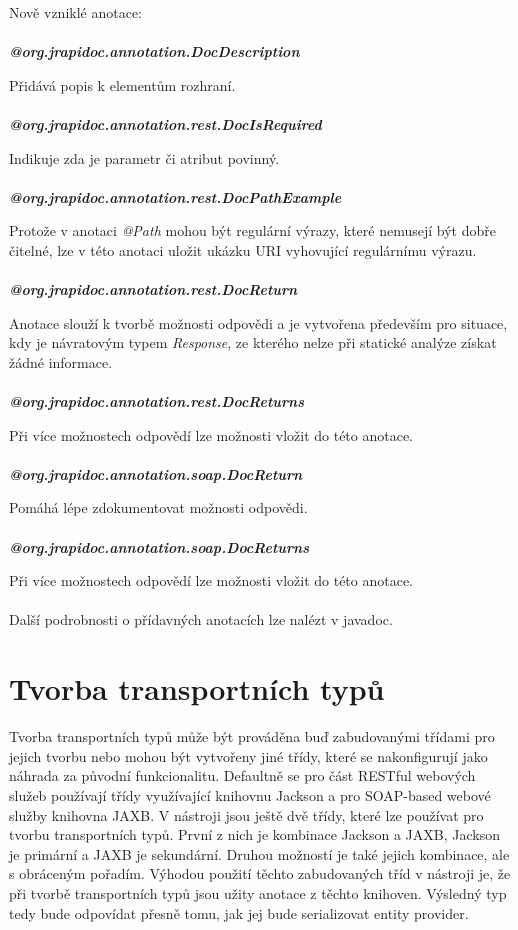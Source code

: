 \documentclass[11pt,twoside,a4paper]{book}
\begin{document}
Nově vzniklé anotace:
\mbox{}\\
\mbox{}\\
\textbf{\textit{@org.jrapidoc.annotation.DocDescription}}

Přidává popis k elementům rozhraní.
\mbox{}\\
\mbox{}\\
\textbf{\textit{@org.jrapidoc.annotation.rest.DocIsRequired}}

Indikuje zda je parametr či atribut povinný.
\mbox{}\\
\mbox{}\\
\textbf{\textit{@org.jrapidoc.annotation.rest.DocPathExample}}

Protože v anotaci {\em @Path} mohou být regulární výrazy, které nemusejí být dobře čitelné, lze v
této anotaci uložit ukázku URI vyhovující regulárnímu výrazu.
\mbox{}\\
\mbox{}\\
\textbf{\textit{@org.jrapidoc.annotation.rest.DocReturn}}

Anotace slouží k tvorbě možnosti odpovědi a je vytvořena především pro situace, kdy je
návratovým typem {\em Response}, ze kterého nelze při statické analýze získat žádné informace.
\mbox{}\\
\mbox{}\\
\textbf{\textit{@org.jrapidoc.annotation.rest.DocReturns}}

Při více možnostech odpovědí lze možnosti vložit do této anotace.
\mbox{}\\
\mbox{}\\
\textbf{\textit{@org.jrapidoc.annotation.soap.DocReturn}}

Pomáhá lépe zdokumentovat možnosti odpovědi.
\mbox{}\\
\mbox{}\\
\textbf{\textit{@org.jrapidoc.annotation.soap.DocReturns}}

Při více možnostech odpovědí lze možnosti vložit do této anotace.
\mbox{}\\
\mbox{}\\
Další podrobnosti o přídavných anotacích lze nalézt v javadoc.

\section{Tvorba transportních typů}

Tvorba transportních typů může být prováděna buď zabudovanými třídami pro jejich
tvorbu nebo mohou být vytvořeny jiné třídy, které se nakonfigurují jako náhrada
za původní funkcionalitu. Defaultně se pro část RESTful webových služeb
používají třídy využívající knihovnu Jackson a pro SOAP-based webové služby
knihovna JAXB. V nástroji jsou ještě dvě třídy, které lze používat pro tvorbu
transportních typů. První z nich je kombinace Jackson a JAXB, Jackson je
primární a JAXB je sekundární. Druhou možností je také jejich kombinace, ale s
obráceným pořadím. Výhodou použití těchto zabudovaných tříd v nástroji je, že
při tvorbě transportních typů jsou užity anotace z těchto knihoven. Výsledný typ
tedy bude odpovídat přesně tomu, jak jej bude serializovat entity provider. 
\end{document}
